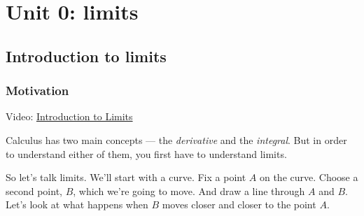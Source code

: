 \documentclass[pdftex, brazil, 12pt, twoside]{article}
\begin{document}
\begin{figure}[H]
  \begin{center}
    \label{fig:survey26}
  \end{center}
\end{figure}




\newpage
\section{Unit 0: limits}
\label{u0}


\subsection{Introduction to limits}
\label{u0-intro}

\subsubsection{Motivation}
\label{u0-intro-motiv}

Video: \href{https://www.youtube.com/watch?v=nh5O6-2Evk8}{Introduction to Limits}

Calculus has two main concepts --- the \emph{derivative}
and the \emph{integral}.
But in order to understand either of them,
you first have to understand limits.

So let's talk limits.
We'll start with a curve.
Fix a point $A$ on the curve.
Choose a second point, $B$, which we're going to move.
And draw a line through $A$ and $B$. Let's look
at what happens when $B$ moves closer and closer to the point
$A$.
\end{document}
